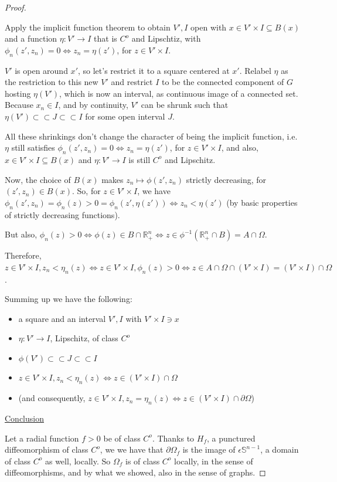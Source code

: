 \documentclass[english,a4paper,10pt,oneside]{scrbook}	%
\theoremstyle{break}
\newenvironment{mproof}[1][\proofname]{%
  \begin{proof}[#1]$ $\par\nobreak\ignorespaces
}{%
  \end{proof}
}
\renewcommand*{\proofname}{Proof}
\theoremstyle{remark}
\newcommand{\mR}{\mathbb{R}}
\newcommand{\mS}{\mathbb{S}^{n-1}}
\newcommand{\cc}{\subset\subset}
\newcommand{\eps}{\epsilon}
\begin{document}
\begin{mproof}
Apply the implicit function theorem to obtain $V',I$ open with $x \in V'\times I\subseteq B(x)$ and a function $\eta:V'\rightarrow I$ that is $C^o$ and Lipschtiz, with $\phi_n(z',z_n)=0 \iff z_n = \eta(z')$, for $z \in V'\times I$.

$V'$ is open around $x'$, so let's restrict it to a square centered at $x'$. Relabel $\eta$ as the restriction to this new $V'$ and restrict $I$ to be the connected component of $G$ hosting $\eta(V')$, which is now an interval, as continuous image of a connected set. Because $x_n \in I$, and by continuity, $V'$ can be shrunk such that $\eta(V')\cc J \cc I$ for some open interval $J$. 

All these shrinkings don't change the character of being the implicit function, i.e. $\eta$ still satisfies $\phi_n(z',z_n)=0 \iff z_n = \eta(z')$, for $z \in V'\times I$, and also,  $x \in V'\times I\subseteq B(x)$ and $\eta:V'\rightarrow I$ is still $C^o$ and Lipschitz.

Now, the choice of $B(x)$ makes $z_n\mapsto \phi(z',z_n)$ strictly decreasing, for $(z',z_n) \in B(x)$.  So, for $z \in V'\times I$, we have $\phi_n(z', z_n) = \phi_n(z)>0=\phi_n(z',\eta(z')) \iff z_n<\eta(z')$ (by basic properties of strictly decreasing functions).

But also, $\phi_n(z) >0 \iff \phi(z) \in B\cap \mR^n_+ \iff z \in \phi^{-1}(\mR^n_+\cap B)=A\cap \Omega$.

Therefore, $z \in V'\times I, z_n<\eta_n(z) \iff z \in V'\times I, \phi_n(z) >0 \iff z \in A\cap \Omega \cap (V'\times I) = (V'\times I)\cap \Omega$.

Summing up we have the following:

\begin{itemize}
	\item a square and an interval $V', I$ with $V'\times I \ni x$
	\item $\eta: V'\rightarrow I$, Lipschitz, of class $C^o$
	\item $\phi(V') \cc J \cc I$
	\item $z \in V'\times I, z_n<\eta_n(z) \iff z \in (V'\times I)\cap \Omega$
	\item (and consequently, $z \in V'\times I, z_n=\eta_n(z) \iff z \in (V'\times I)\cap \partial \Omega$)
\end{itemize}

\underline{Conclusion}

Let a radial function $f>0$ be of class $C^o$. Thanks to $H_f$, a punctured diffeomorphism of class $C^o$, we we have that $\partial \Omega_f$ is the image of $\eps\mS$, a domain of class $C^o$ as well, locally. So $\Omega_f $ is of class $C^o$ locally, in the sense of diffeomorphisms, and by what we showed, also in the sense of graphs.


\end{mproof}
\end{document}
